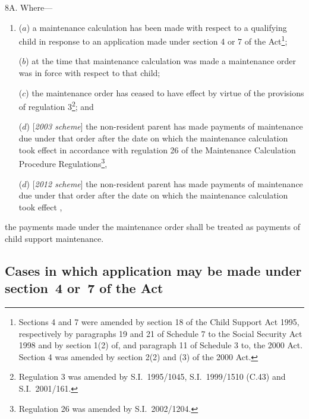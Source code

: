 \documentclass[12pt,a4paper]{article}
\begin{document}
8A.  Where—
\begin{enumerate}\item[]
($a$) a maintenance calculation has been made with respect to a qualifying child in response to an application made under section 4 or 7 of the Act\footnote{Sections 4 and 7 were amended by section 18 of the Child Support Act 1995, respectively by paragraphs 19 and 21 of Schedule 7 to the Social Security Act 1998 and by section 1(2) of, and paragraph 11 of Schedule 3 to, the 2000 Act. Section 4 was amended by section 2(2) and (3) of the 2000 Act.};

($b$) at the time that maintenance calculation was made a maintenance order was in force with respect to that child;

($c$) the maintenance order has ceased to have effect by virtue of the provisions of regulation 3\footnote{Regulation 3 was amended by S.I.\ 1995/1045, S.I.\ 1999/1510 (C.43) and S.I.\ 2001/161.}; and

($d$) [\emph{2003 scheme}] the non-resident parent has made payments of maintenance due under that order after the date on which the maintenance calculation took effect in accordance with regulation 26 of the Maintenance Calculation Procedure Regulations\footnote{Regulation 26 was amended by S.I.\ 2002/1204.},

($d$) [\emph{2012 scheme}] the non-resident parent has made payments of maintenance due under that order after the date on which the maintenance calculation took effect%
,
\end{enumerate}
the payments made under the maintenance order shall be treated as payments of child support maintenance.


\subsection[9. Cases in which application may be made under section 4 or 7 of the Act]{Cases in which application may be made under section~4 or~7 of the Act}
\end{document}
